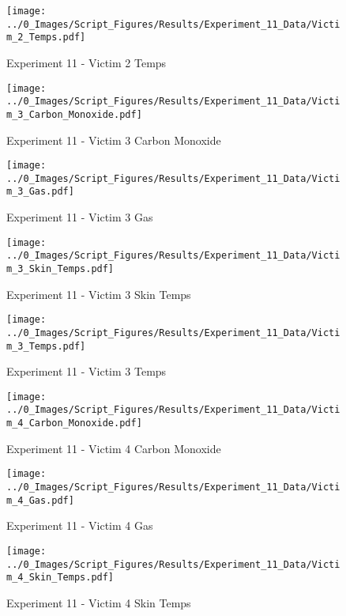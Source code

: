 	\begin{figure}[H]
		\centering
		\texttt{[image: ../0\_Images/Script\_Figures/Results/Experiment\_11\_Data/Victim\_2\_Temps.pdf]}
		\caption[]{Experiment 11 - Victim 2 Temps}
	\end{figure}
 
	\clearpage

	\begin{figure}[H]
		\centering
		\texttt{[image: ../0\_Images/Script\_Figures/Results/Experiment\_11\_Data/Victim\_3\_Carbon\_Monoxide.pdf]}
		\caption[]{Experiment 11 - Victim 3 Carbon Monoxide}
	\end{figure}
 

	\begin{figure}[H]
		\centering
		\texttt{[image: ../0\_Images/Script\_Figures/Results/Experiment\_11\_Data/Victim\_3\_Gas.pdf]}
		\caption[]{Experiment 11 - Victim 3 Gas}
	\end{figure}
 
	\clearpage

	\begin{figure}[H]
		\centering
		\texttt{[image: ../0\_Images/Script\_Figures/Results/Experiment\_11\_Data/Victim\_3\_Skin\_Temps.pdf]}
		\caption[]{Experiment 11 - Victim 3 Skin Temps}
	\end{figure}
 

	\begin{figure}[H]
		\centering
		\texttt{[image: ../0\_Images/Script\_Figures/Results/Experiment\_11\_Data/Victim\_3\_Temps.pdf]}
		\caption[]{Experiment 11 - Victim 3 Temps}
	\end{figure}
 
	\clearpage

	\begin{figure}[H]
		\centering
		\texttt{[image: ../0\_Images/Script\_Figures/Results/Experiment\_11\_Data/Victim\_4\_Carbon\_Monoxide.pdf]}
		\caption[]{Experiment 11 - Victim 4 Carbon Monoxide}
	\end{figure}
 

	\begin{figure}[H]
		\centering
		\texttt{[image: ../0\_Images/Script\_Figures/Results/Experiment\_11\_Data/Victim\_4\_Gas.pdf]}
		\caption[]{Experiment 11 - Victim 4 Gas}
	\end{figure}
 
	\clearpage

	\begin{figure}[H]
		\centering
		\texttt{[image: ../0\_Images/Script\_Figures/Results/Experiment\_11\_Data/Victim\_4\_Skin\_Temps.pdf]}
		\caption[]{Experiment 11 - Victim 4 Skin Temps}
	\end{figure}
 

